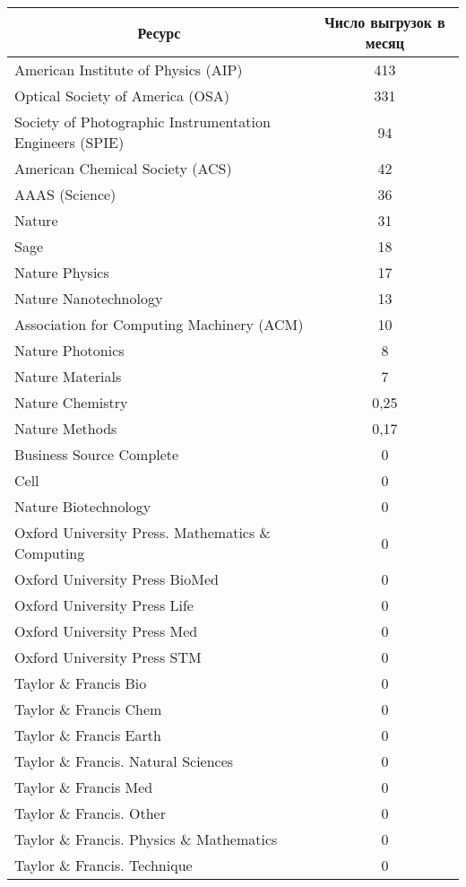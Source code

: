 \begin{multicols}{2}
\begin{table*}[b]
\begin{center}
\begin{tabular}{|l|c|}
\hline
\multicolumn{1}{|c|}{Ресурс}&Число выгрузок
в месяц\\
\hline
American Institute of Physics (AIP)&413\hphantom{9}\\
Optical Society of America (OSA)&331\hphantom{9}\\
Society of Photographic Instrumentation Engineers (SPIE) &94\\
American Chemical Society (ACS)&42\\
AAAS (Science)&36\\
Nature&31\\
Sage &18\\
Nature Physics &17\\
Nature Nanotechnology&13\\
Association for Computing Machinery (ACM)&10\\
Nature Photonics &\hphantom{9}8\\
Nature Materials&\hphantom{9}7\\
Nature Chemistry &\hphantom{9999}0,25\\
Nature Methods &\hphantom{9999}0,17\\
Business Source Complete &\hphantom{9}0\\
Cell&\hphantom{9}0\\
Nature Biotechnology &\hphantom{9}0\\
Oxford University Press. Mathematics \& Computing &\hphantom{9}0\\
Oxford University Press BioMed &\hphantom{9}0\\
Oxford University Press Life &\hphantom{9}0\\
Oxford University Press Med &\hphantom{9}0\\
Oxford University Press STM &\hphantom{9}0\\
Taylor \& Francis Bio &\hphantom{9}0\\
Taylor \& Francis Chem &\hphantom{9}0\\
Taylor \& Francis Earth &\hphantom{9}0\\
Taylor \& Francis. Natural Sciences &\hphantom{9}0\\
Taylor \& Francis Med &\hphantom{9}0\\
Taylor \& Francis. Other &\hphantom{9}0\\
Taylor \& Francis. Physics \& Mathematics &\hphantom{9}0\\
Taylor \& Francis. Technique&\hphantom{9}0\\
\hline
\end{tabular}
\end{center}
\end{table*}
     

\end{multicols}
